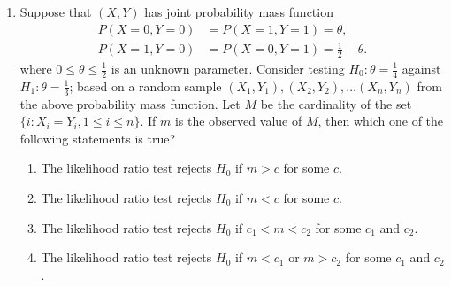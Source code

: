 \begin{enumerate}[label=\thechapter.\arabic*,ref=\thechapter.\theenumi]
\begin{align*}
f\brak{x;\theta}= \begin{cases} 
      \frac{2}{\theta x}\brak{\log_{e}x}e^{-\frac{\brak{\log_{e}x}^2}{\theta}} &, 0<x<1  \\
      0 &, otherwise
   \end{cases}
\end{align*}
where $\theta > 0$ is an unknown parameter. Then which of the following statements is true,\\
\begin{enumerate}[label=(\Alph*)]
\item $\frac{1}{n}\sum_{i=1}^{n}\brak{\ln X_i}^2$ is the maximum likelihood estimator of $\theta$
\item $\frac{1}{n-1}\sum_{i=1}^{n}\brak{\ln X_i}^2$ is the maximum likelihood estimator of $\theta$
\item $\frac{1}{n}\sum_{i=1}^{n}\ln X_i$ is the maximum likelihood estimator of $\theta$
\item $\frac{1}{n-1}\sum_{i=1}^{n}\ln X_i$ is the maximum likelihood estimator of $\theta$
\end{enumerate}
\hfill (GATE ST 2023)
\\

\item Suppose that $(X, Y)$ has joint probability mass function
\begin{align}
P(X = 0, Y = 0) &= P(X = 1, Y = 1) = \theta, \\
P(X = 1, Y = 0) &= P(X = 0, Y = 1) = \frac{1}{2} - \theta.
\end{align}
where $0 \le \theta \le \frac{1}{2}$ is an unknown parameter. Consider testing $H_0 : \theta = \frac{1}{4}$ against $H_1 : \theta = \frac{1}{3}$; based on a random sample ${(X_1 , Y_1 ), (X_2 , Y_2 ), \ldots (X_n , Y_n )}$ from the above probability mass function. Let $M$ be the cardinality of the set $\{i: X_i = Y_i , 1 \le i\le n\}$. If $m$ is the observed value of $M$, then which one of the following statements is true?
\begin{enumerate}
\item The likelihood ratio test rejects $H_0$ if $m > c$ for some $c$.
\item The likelihood ratio test rejects $H_0$ if $m < c$ for some $c$.
\item The likelihood ratio test rejects $H_0$ if $c_1 < m < c_2$ for some $c_1$ and $c_2$.
\item The likelihood ratio test rejects $H_0$ if $m < c_1$ or $m > c_2$ for some $c_1$ and $c_2$.

\end{enumerate}
\end{enumerate}
